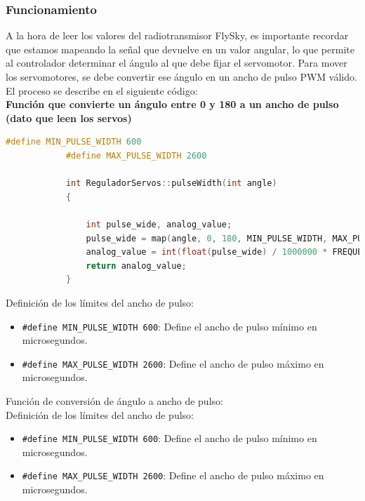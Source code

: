     \subsubsection{Funcionamiento}

        A la hora de leer los valores del radiotransmisor FlySky, es importante recordar que estamos mapeando la señal que devuelve en un valor angular, lo que permite al controlador determinar el ángulo al que debe fijar el servomotor. Para mover los servomotores, se debe convertir ese ángulo en un ancho de pulso PWM válido. El proceso se describe en el siguiente código: \\ 

        \textbf{Función que convierte un ángulo entre 0 y 180 a un ancho de pulso (dato que leen los servos)}\\
        
        \begin{lstlisting}[language=C++, caption=Conversión de ángulo a ancho de pulso PWM]
            #define MIN_PULSE_WIDTH 600
            #define MAX_PULSE_WIDTH 2600

            int ReguladorServos::pulseWidth(int angle)
            {
               
                int pulse_wide, analog_value;
                pulse_wide = map(angle, 0, 180, MIN_PULSE_WIDTH, MAX_PULSE_WIDTH);
                analog_value = int(float(pulse_wide) / 1000000 * FREQUENCY * 4096);
                return analog_value;
            }
        \end{lstlisting}

        Definición de los límites del ancho de pulso:\\ 

        \begin{itemize}
            \item \texttt{\#define MIN\_PULSE\_WIDTH 600}: Define el ancho de pulso mínimo en microsegundos.
            \item \texttt{\#define MAX\_PULSE\_WIDTH 2600}: Define el ancho de pulso máximo en microsegundos.
        \end{itemize}

        Función de conversión de ángulo a ancho de pulso:\\ 

        Definición de los límites del ancho de pulso:\\

        \begin{itemize}
        \item \texttt{\#define MIN\_PULSE\_WIDTH 600}: Define el ancho de pulso mínimo en microsegundos.
        \item \texttt{\#define MAX\_PULSE\_WIDTH 2600}: Define el ancho de pulso máximo en microsegundos.
        \end{itemize}

